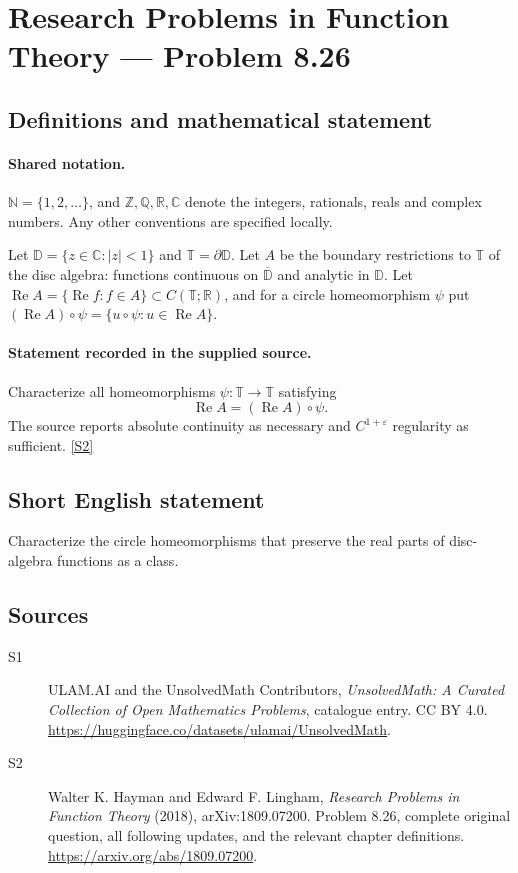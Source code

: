\documentclass[11pt]{book}
\newcommand{\sref}[2]{\hyperlink{source:#1:#2}{[S#2]}}
\begin{document}
\section{Research Problems in Function Theory — Problem 8.26}\label{statement}

\subsection{Definitions and mathematical statement}

\paragraph{Shared notation.}$\mathbb N=\{1,2,\ldots\}$, and $\mathbb Z,\mathbb Q,\mathbb R,\mathbb C$ denote the integers, rationals, reals and complex numbers. Any other conventions are specified locally.


Let $\mathbb D=\{z\in\mathbb C:|z|<1\}$ and $\mathbb T=\partial\mathbb D$. Let $A$ be the boundary restrictions to $\mathbb T$ of the disc algebra: functions continuous on $\overline{\mathbb D}$ and analytic in $\mathbb D$. Let $\operatorname{Re}A=\{\operatorname{Re}f:f\in A\}\subset C(\mathbb T;\mathbb R)$, and for a circle homeomorphism $\psi$ put $(\operatorname{Re}A)\circ\psi=\{u\circ\psi:u\in\operatorname{Re}A\}$.
\paragraph{Statement recorded in the supplied source.}
Characterize all homeomorphisms $\psi:\mathbb T\to\mathbb T$ satisfying \[\operatorname{Re}A=(\operatorname{Re}A)\circ\psi.\] The source reports absolute continuity as necessary and $C^{1+\varepsilon}$ regularity as sufficient. \sref{statement}{2}
\subsection{Short English statement}
Characterize the circle homeomorphisms that preserve the real parts of disc-algebra functions as a class.
\subsection{Sources}
\begin{description}
\item[\hypertarget{source:statement:1}{S1}] ULAM.AI and the UnsolvedMath Contributors, \emph{UnsolvedMath: A Curated Collection of Open Mathematics Problems}, catalogue entry. CC BY 4.0. \url{https://huggingface.co/datasets/ulamai/UnsolvedMath}.
\item[\hypertarget{source:statement:2}{S2}] Walter K. Hayman and Edward F. Lingham, \emph{Research Problems in Function Theory} (2018), arXiv:1809.07200. Problem 8.26, complete original question, all following updates, and the relevant chapter definitions. \url{https://arxiv.org/abs/1809.07200}.
\end{description}
\label{end:statement}
\end{document}
